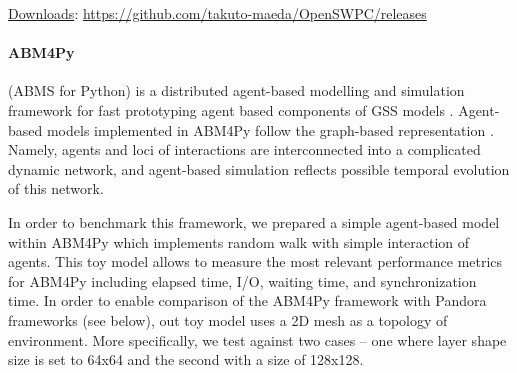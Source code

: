 \underline{Downloads}: \url{https://github.com/takuto-maeda/OpenSWPC/releases}
\iffalse
\underline{Use case description}

The first step was to install the required system packages such as \textit{gmt, gmt-dcw, gmt-gshhg, libnetcdf-dev}. The next one required to run \textit{gen\_JIVSM.sh} script to generate files used as a model input around Japanese Islands for seismic wave propagation in and around Japan. They describe 3D complicated subsurface structures of the earth. The above script used the following input files \textit{lp2012nankai-e\_str.zip, lp2012nankai-w\_str.zip} available from public repository at \cite{HERP} and \textit{ETOPO1\_Bed\_g\_gmt4.grd.gz} from \cite{NOAA} to be installed in the \textit{dataset/vmodel} folder.
Finally, inside the \textit{OpenSWPC/src} folder the files \textit{shared/makefile.arch} and \textit{shared/makefile-tools.arch} needed to be updated to fix the system paths.
After successful compilation an input file (e.g example/input.inf) had to be provided to run the application. Critical attributes influencing the run times included the grid size defined by \textit{nx = 1000, ny = 875, nz = 200}   (total grid number in x, y and z directions) and \textit{nt = 100}  (time step number)

Depending on the hardware and installed libraries the following MPI versions were used: Intel\textregistered MPI Library for Linux\textregistered OS, Version 2017 2017.1.132 (2-node Intel\textregistered\ Xeon\textregistered\ Gold 6140, Eagle cluster), Open MPI 1.10.2 (ARM, AMD Epyc\textsuperscript{TM})
\fi


\paragraph{ABM4Py} (ABMS for Python) is a distributed agent-based modelling and simulation framework for fast prototyping agent based components of GSS models \cite{2018:abm4py}.
Agent-based models implemented in \textsf{ABM4Py} follow the graph-based representation \cite{2018:abm4py,2017:graph_abms}.
Namely, agents and loci of interactions are interconnected into a complicated dynamic network, and agent-based simulation reflects possible temporal evolution of this network.

In order to benchmark this framework, we prepared a simple agent-based model within \textsf{ABM4Py} which implements random walk with simple interaction of agents.
This toy model allows to measure the most relevant performance metrics for \textsf{ABM4Py} including elapsed time, I/O, waiting time, and synchronization time.
In order to enable comparison of the \textsf{ABM4Py} framework with \textsf{Pandora} frameworks (see below), out toy model uses a 2D mesh as a topology of environment.
More specifically, we test against two cases -- one where layer shape size is set to 64x64 and the second with a size of 128x128.

